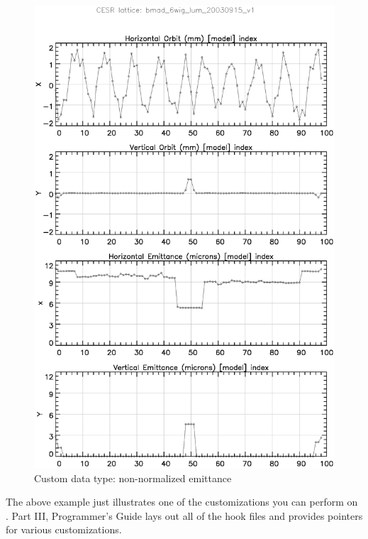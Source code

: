 \begin{figure}
  \centering
  \includegraphics[width=5in]{plot_emittance.eps}
  \caption{Custom data type: non-normalized emittance}
  \label{f:plot_emittance}
\end{figure}


The above example just illustrates one of the customizations you can
perform on \tao.  Part III, Programmer's Guide lays out all of the
hook files and provides pointers for various customizations.

